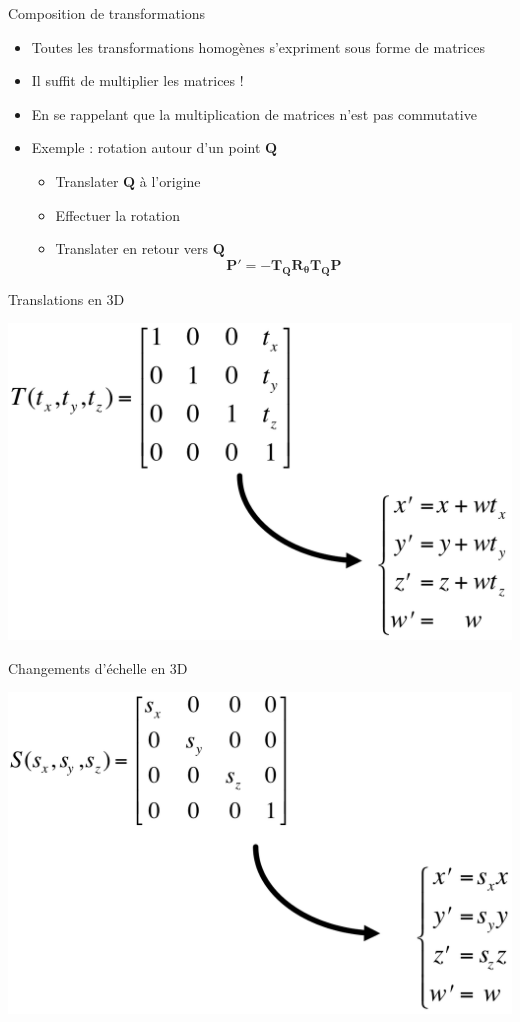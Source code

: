 \begin{frame}{Composition de transformations}
\begin{itemize}
\item Toutes les transformations homogènes s'expriment sous forme de matrices
\item Il suffit de multiplier les matrices !
\item En se rappelant que la multiplication de matrices n'est pas commutative
\item Exemple : rotation autour d'un point $\mathbf{Q}$
\begin{itemize}
\item Translater $\mathbf{Q}$ à l'origine
\item Effectuer la rotation
\item Translater en retour vers $\mathbf{Q}$
$$
\mathbf{P'} = -\mathbf{T_Q R_{\theta} T_Q P}
$$
\end{itemize}
\end{itemize}
\end{frame}


\begin{frame}{Translations en 3D}
\begin{center}
\includegraphics[width=.8\textwidth]{figs/transh3.png}
\end{center}
\end{frame}

\begin{frame}{Changements d'échelle en 3D}
\begin{center}
\includegraphics[width=.8\textwidth]{figs/scaleh3.png}
\end{center}
\end{frame}

